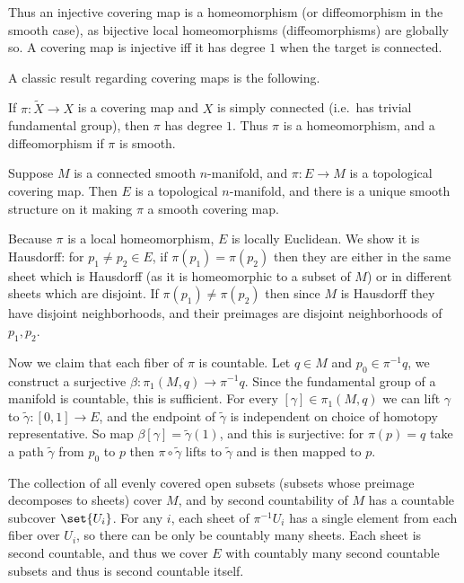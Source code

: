\eproof

Thus an injective covering map is a homeomorphism (or diffeomorphism in the smooth case), as bijective local homeomorphisms (diffeomorphisms) are
globally so.
A covering map is injective iff it has degree $1$ when the target is connected.

A classic result regarding covering maps is the following.

\bthrm

    If $\pi\colon\tilde X\to X$ is a covering map and $X$ is simply connected (i.e.\ has trivial fundamental group), then $\pi$ has degree $1$.
    Thus $\pi$ is a homeomorphism, and a diffeomorphism if $\pi$ is smooth.

\ethrm

\bprop

    Suppose $M$ is a connected smooth $n$-manifold, and $\pi\colon E\to M$ is a topological covering map.
    Then $E$ is a topological $n$-manifold, and there is a unique smooth structure on it making $\pi$ a smooth
    covering map.

\eprop

\bproof

    Because $\pi$ is a local homeomorphism, $E$ is locally Euclidean.
    We show it is Hausdorff: for $p_1\neq p_2\in E$, if $\pi(p_1)=\pi(p_2)$ then they are either in the same sheet
    which is Hausdorff (as it is homeomorphic to a subset of $M$) or in different sheets which are disjoint.
    If $\pi(p_1)\neq\pi(p_2)$ then since $M$ is Hausdorff they have disjoint neighborhoods, and their preimages
    are disjoint neighborhoods of $p_1,p_2$.

    Now we claim that each fiber of $\pi$ is countable.
    Let $q\in M$ and $p_0\in\pi^{-1}q$, we construct a surjective $\beta\colon\pi_1(M,q)\to\pi^{-1}q$.
    Since the fundamental group of a manifold is countable, this is sufficient.
    For every $[\gamma]\in\pi_1(M,q)$ we can lift $\gamma$ to $\tilde\gamma\colon[0,1]\to E$, and the endpoint of $\tilde\gamma$
    is independent on choice of homotopy representative.
    So map $\beta[\gamma]=\tilde\gamma(1)$, and this is surjective: for $\pi(p)=q$ take a path $\tilde\gamma$ from $p_0$ to $p$
    then $\pi\circ\tilde\gamma$ lifts to $\tilde\gamma$ and is then mapped to $p$.

    The collection of all evenly covered open subsets (subsets whose preimage decomposes to sheets) cover $M$, and
    by second countability of $M$ has a countable subcover $\set{U_i}$.
    For any $i$, each sheet of $\pi^{-1}U_i$ has a single element from each fiber over $U_i$, so there can be only
    be countably many sheets.
    Each sheet is second countable, and thus we cover $E$ with countably many second countable subsets and thus is
    second countable itself.

